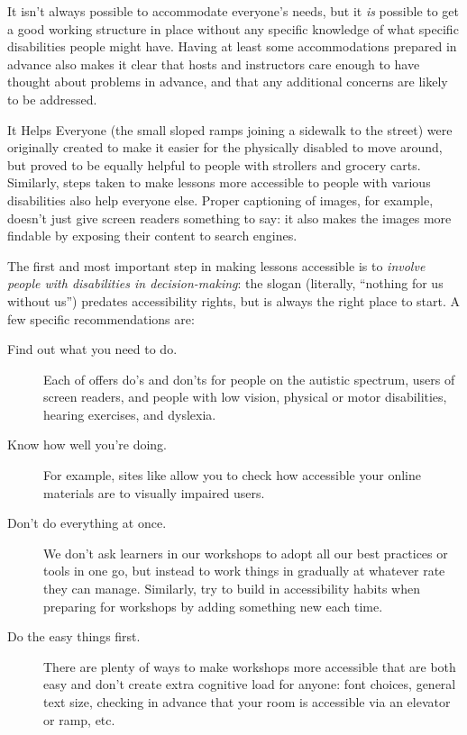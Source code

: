 It isn't always possible to accommodate everyone's needs, but it \emph{is}
possible to get a good working structure in place without any specific
knowledge of what specific disabilities people might have. Having at
least some accommodations prepared in advance also makes it clear that
hosts and instructors care enough to have thought about problems in
advance, and that any additional concerns are likely to be addressed.

\begin{aside}{It Helps Everyone}
   (the small sloped ramps joining a sidewalk to
  the street) were originally created to make it easier for the
  physically disabled to move around, but proved to be equally helpful
  to people with strollers and grocery carts. Similarly, steps taken
  to make lessons more accessible to people with various disabilities
  also help everyone else. Proper captioning of images, for example,
  doesn't just give screen readers something to say: it also makes the
  images more findable by exposing their content to search engines.
\end{aside}

The first and most important step in making lessons accessible is to
\emph{involve people with disabilities in decision-making}: the slogan
\emph{} (literally, ``nothing
for us without us'') predates accessibility rights, but is always the
right place to start. A few specific recommendations are:

\begin{description}
\item[Find out what you need to do.]
Each of  offers do's and
don'ts for people on the autistic spectrum, users of screen readers,
and people with low vision, physical or motor disabilities, hearing
exercises, and dyslexia.
\item[Know how well you're doing.]
For example, sites like  allow you to check how
accessible your online materials are to visually impaired users.
\item[Don't do everything at once.]
We don't ask learners in our workshops to adopt all our best
practices or tools in one go, but instead to work things in
gradually at whatever rate they can manage. Similarly, try to build
in accessibility habits when preparing for workshops by adding
something new each time.
\item[Do the easy things first.]
There are plenty of ways to make workshops more accessible that are
both easy and don't create extra cognitive load for anyone: font
choices, general text size, checking in advance that your room is
accessible via an elevator or ramp, etc.
\end{description}


